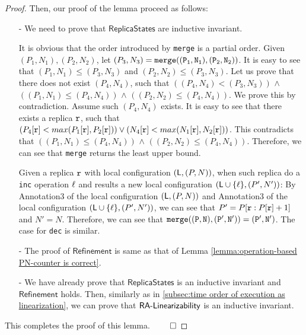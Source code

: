 \begin {proof}


Then, our proof of the lemma proceed as follows:

\begin{itemize}
\setlength{\itemsep}{0.5pt}
\item[-] We need to prove that $\mathsf{ReplicaStates}$ are inductive invariant.

It is obvious that the order introduced by {\tt merge} is a partial order. Given $(P_1,N_1), (P_2,N_2)$, let $(P_3,N_3) = \alabelshort[{\tt merge}]{ (P_1,N_1), (P_2,N_2) }$. It is easy to see that $(P_1,N_1) \leq (P_3,N_3)$ and $(P_2,N_2) \leq (P_3,N_3)$. Let us prove that there does not exist $(P_4,N_4)$, such that $( (P_4,N_4)<(P_3,N_3) )$ $\wedge$ $((P_1,N_1) \leq (P_4,N_4))$ $\wedge$ $((P_2,N_2) \leq (P_4,N_4))$. We prove this by contradiction. Assume such $(P_4,N_4)$ exists. It is easy to see that there exists a replica $\mathtt{r}$, such that $(P_4[\mathtt{r}] < max ( P_1[\mathtt{r}],P_2[\mathtt{r}] )) \vee (N_4[\mathtt{r}] < max ( N_1[\mathtt{r}],N_2[\mathtt{r}] ))$. This contradicts that $((P_1,N_1) \leq (P_4,N_4))$ $\wedge$ $((P_2,N_2) \leq (P_4,N_4))$. Therefore, we can see that {\tt merge} returns the least upper bound.

Given a replica $\mathtt{r}$ with local configuration $(\mathsf{L},(P,N))$, when such replica do a {\tt inc} operation $\ell$ and results a new local configuration $(\mathsf{L} \cup \{ \ell \},(P',N'))$: By Annotation3 of the local configuration $(\mathsf{L},(P,N))$ and Annotation3 of the local configuration $(\mathsf{L} \cup \{ \ell \},(P',N'))$, we can see that $P' = P[\mathtt{r}: P[\mathtt{r}]+1]$ and $N' = N$. Therefore, we can see that $ \alabelshort[{\tt merge}]{ (P,N), (P',N') } = (P',N')$. The case for {\tt dec} is similar.

\item[-] The proof of $\mathsf{Refinement}$ is same as that of Lemma \ref{lemma:operation-based PN-counter is correct}.

\item[-] We have already prove that $\mathsf{ReplicaStates}$ is an inductive invariant and $\mathsf{Refinement}$ holds. Then, similarly as in \sectionautorefname \ref{subsec:time order of execution as linearization}, we can prove that $\mathsf{RA\text{-}Linearizability{}}$ is an inductive invariant.
\end{itemize}

This completes the proof of this lemma. $\qed$
\end {proof}





